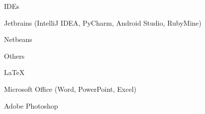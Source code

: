 \begin{cventries}
        {}
        {IDEs}
        {}
        {}
        {
            \begin{cvitems}
                \item{Jetbrains (IntelliJ IDEA, PyCharm, Android Studio, RubyMine)}
                \item{Netbeans}
            \end{cvitems}
        }
    \cventry
        {}
        {Others}
        {}
        {}
        {
            \begin{cvitems}
                  \item{LaTeX}
                  \item{Microsoft Office (Word, PowerPoint, Excel)}
                  \item{Adobe Photoshop}
            \end{cvitems}
        }

\end{cventries}
